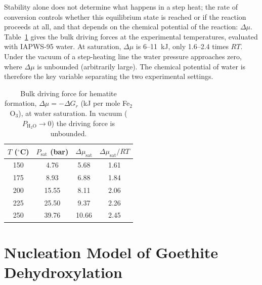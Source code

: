Stability alone does not determine what happens in a step heat; the rate of conversion controls
whether this equilibrium state is reached or if the reaction proceeds at all,
and that depends on the chemical potential of the reaction: $\Delta\mu$. Table~\ref{tab:gt_dmu} gives the bulk driving
forces at the experimental temperatures, evaluated with IAPWS-95 water. At saturation,
$\Delta\mu$ is 6--11~kJ, only 1.6--2.4 times $RT$. Under the vacuum of a step-heating line the water
pressure approaches zero, where $\Delta\mu$ is unbounded (arbitrarily large). The chemical
potential of water is therefore the key variable separating the two experimental settings.

\begin{table}[htbp]
  \centering
  \caption{Bulk driving force for hematite formation, $\Delta\mu = -\Delta G_r$ (kJ per mole Fe$_2$O$_3$), at water saturation. In vacuum ($P_{\mathrm{H_2O}}\rightarrow0$) the driving force is unbounded.}
  \label{tab:gt_dmu}
  \begin{tabular}{cccc}
    \hline
    $T$ ($^\circ$C) & $P_{\mathrm{sat}}$ (bar) & $\Delta\mu_{\mathrm{sat}}$ & $\Delta\mu_{\mathrm{sat}}/RT$ \\
    \hline
    150 & 4.76  & 5.68  & 1.61 \\
    175 & 8.93  & 6.88  & 1.84 \\
    200 & 15.55 & 8.11  & 2.06 \\
    225 & 25.50 & 9.37  & 2.26 \\
    250 & 39.76 & 10.66 & 2.45 \\
    \hline
  \end{tabular}
\end{table}

\section{Nucleation Model of Goethite Dehydroxylation}\label{sec:gt_nuc_si}

